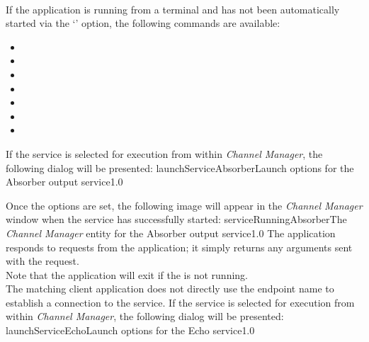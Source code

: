 \insertAppParameters
{}
\insertOutputServiceComment\\

If the application is running from a terminal and has not been automatically started via
the `' option, the following commands are available:
\begin{itemize}
\item{}
\item\exSp{}
\item\exSp{}
\item\exSp{}
\item\exSp{}
\item\exSp{}
\item\exSp{}
\end{itemize}
\condPage
If the service is selected for execution from within \emph{Channel Manager}, the following
dialog will be presented:
%
{launchServiceAbsorber}{Launch options for the Absorber output service}{1.0}

Once the options are set, the following image will appear in the \emph{Channel Manager}
window when the service has successfully started:
%
{serviceRunningAbsorber}{The \emph{Channel Manager} entity for the Absorber output
service}{1.0}
\condPage
{}
The  application responds to
 requests from the
 application; it simply returns any arguments
sent with the request.\\

Note that the application will exit if the
 is not running.\\

\insertAutoAppParameters
{}
The matching client application does not directly use the endpoint name to establish a
connection to the service.
\condPage
If the service is selected for execution from within \emph{Channel Manager}, the following
dialog will be presented:
%
{launchServiceEcho}{Launch options for the Echo service}{1.0}

